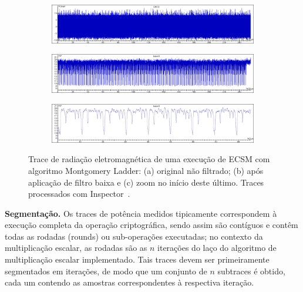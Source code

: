 \begin{figure}	
	\centering
	\begin{subfigure}[b]{0.8\textwidth}
		\includegraphics[width=1\linewidth]{figures/Trace_EM___MontLadder___CPU_168MHz___SR_1GHz___32MS___UNFiltered.png}
		\caption{}
		\label{fig:traceUnfiltered} 
	\end{subfigure}
	
	\begin{subfigure}[b]{0.8\textwidth}
		\includegraphics[width=1\linewidth]{figures/Trace_EM___MontLadder___CPU_168MHz___SR_1GHz___32MS___Filtered.png}
		\caption{}
		\label{fig:filtered}
	\end{subfigure}	

	\begin{subfigure}[b]{0.8\textwidth}
		\includegraphics[width=1\linewidth]{figures/Trace_EM___MontLadder___CPU_168MHz___SR_1GHz___32MS___Filtered___Zoom_in.png}
		\caption{}
		\label{fig:filteredZoomIn}
	\end{subfigure}
	\label{fig:tracesFiltering}
	\caption{Trace de radiação eletromagnética de uma execução de ECSM com algoritmo Montgomery Ladder: (a) original não filtrado; (b) após aplicação de filtro baixa e (c) zoom no início deste último. Traces processados com Inspector~\cite{RiscureInspector}.}
\end{figure}

\noindent \textbf{Segmentação.} Os traces de potência medidos tipicamente correspondem à execução completa da operação criptográfica, sendo assim são contíguos e contêm todas as rodadas (rounds) ou sub-operações executadas; no contexto da multiplicação escalar, as rodadas são as $n$ iterações do laço do algoritmo de multiplicação escalar implementado. Tais traces devem ser primeiramente segmentados em iterações, de modo que um conjunto de $n$ subtraces é obtido, cada um contendo as amostras correspondentes à respectiva iteração.

